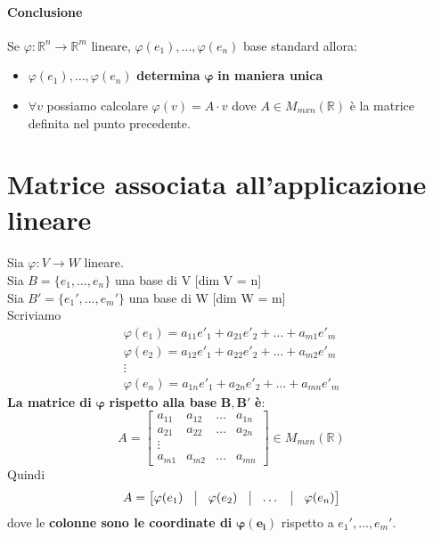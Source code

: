 \documentclass[a4paper, 12pt]{report}
\begin{document}
            \paragraph{Conclusione} Se $\varphi:\mathbb{R}^n\rightarrow \mathbb{R}^m$ lineare, $\varphi(e_1),...,\varphi(e_n)$ base standard allora:
            \begin{itemize}
                \item $\varphi(e_1),\dots,\varphi(e_n)$ \textbf{determina} $\boldsymbol{\varphi}$\textbf{ in maniera unica}
                \item $\forall v$ possiamo calcolare $\varphi(v)=A \cdot v$ dove $A \in M_{mxn} (\mathbb{R})$ è la matrice definita nel punto precedente.
            \end{itemize}
        \section{Matrice associata all'applicazione lineare}
            \paragraph{}Sia $\varphi:V \rightarrow W$ lineare.\\
            Sia $B=\{e_1,\dots,e_n\}$ una base di V [dim V = n]\\
            Sia $B'=\{e_1',\dots,e_m'\}$ una base di W [dim W = m]\\
            Scriviamo
            $$
            \begin{matrix}
                \varphi(e_1)=a_{11}e'_1+a_{21}e'_2+\dots+a_{m1}e'_m\\
                \varphi(e_2)=a_{12}e'_1+a_{22}e'_2+\dots+a_{m2}e'_m\\
                \vdots\\
                \varphi(e_n)=a_{1n}e'_1+a_{2n}e'_2+\dots+a_{mn}e'_m
            \end{matrix}
            $$
            \textbf{La matrice di} $\boldsymbol{\varphi}$ \textbf{rispetto alla base} $\boldsymbol{B,B'}$ \textbf{è}:
            $$
            A=
            \begin{bmatrix}
                a_{11} & a_{12} & \dots & a_{1n}\\
                a_{21} & a_{22} & \dots & a_{2n}\\
                \vdots\\
                a_{m1} & a_{m2} & \dots & a_{mn}
            \end{bmatrix}
            \in M_{mxn}(\mathbb{R})
            $$
            Quindi 
            $$
            A=
            \begin{bmatrix}
                \varphi(e_1)& \vline & \varphi(e_2)& \vline & \dots & \vline & \varphi(e_n)
            \end{bmatrix}
            $$
            dove le \textbf{colonne sono le coordinate di} $\boldsymbol{\varphi(e_i)}$ rispetto a $e_1',\dots,e_m'$.
\end{document}
